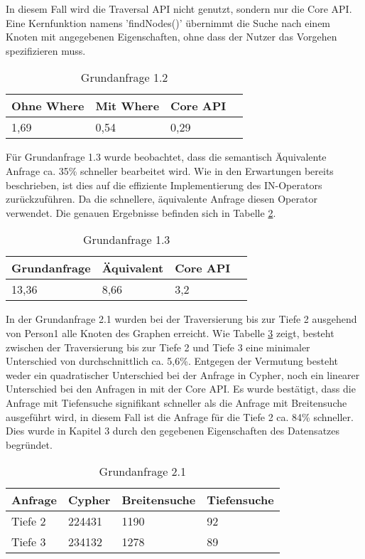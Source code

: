 In diesem Fall wird die Traversal API nicht genutzt, sondern nur die Core API. Eine Kernfunktion namens 'findNodes()' übernimmt die Suche nach einem Knoten mit angegebenen Eigenschaften, ohne dass der Nutzer das Vorgehen spezifizieren muss.  
\FloatBarrier
\begin{table}[h]
	\centering
		\begin{tabular}{ |p{3cm}|p{3cm}|p{3cm}|p{3cm}|  }
			\hline
			Ohne Where& Mit Where  &Core API\\
			\hline
			1,69   &  0,54  &0,29 \\
			\hline
		\end{tabular}
		\FloatBarrier
		\caption{Grundanfrage 1.2}
		\label{tab:Query1_2}
\end{table}
\FloatBarrier
Für Grundanfrage 1.3 wurde beobachtet, dass die semantisch Äquivalente Anfrage ca. 35\% schneller bearbeitet wird. Wie in den Erwartungen bereits beschrieben, ist dies auf die effiziente Implementierung des IN-Operators zurückzuführen. Da die schnellere, äquivalente Anfrage diesen Operator verwendet.
Die genauen Ergebnisse befinden sich in Tabelle	\ref{tab:Query1_3}.
\begin{table}[h]
	\centering
		\begin{tabular}{ |p{3cm}|p{3cm}|p{3cm}|p{3cm}|  }
			\hline
			Grundanfrage & Äquivalent&Core API\\
			\hline
			 13,36    & 8,66 &  3,2\\
			\hline
		\end{tabular}
		\caption{Grundanfrage 1.3}
		\label{tab:Query1_3}
\end{table}
\FloatBarrier
In der Grundanfrage 2.1 wurden bei der Traversierung bis zur Tiefe 2 ausgehend von Person1 alle Knoten des Graphen erreicht. Wie Tabelle \ref{tab:Query2_1} zeigt, besteht zwischen der Traversierung bis zur Tiefe 2 und Tiefe 3  eine minimaler Unterschied von durchschnittlich ca. 5,6\%. Entgegen der Vermutung besteht weder ein quadratischer Unterschied bei der Anfrage in Cypher, noch ein linearer Unterschied bei den Anfragen in mit der Core API. \newline 
Es wurde bestätigt, dass die Anfrage mit Tiefensuche signifikant schneller als die Anfrage mit Breitensuche ausgeführt wird, in diesem Fall ist die Anfrage für die Tiefe 2 ca. 84\% schneller. Dies wurde in Kapitel 3 durch den gegebenen Eigenschaften des Datensatzes begründet. 
\FloatBarrier
\begin{table}[h]
\centering
		\begin{tabular}{ |p{3cm}||p{3cm}|p{3cm}|p{3cm}|  }
			\hline
			Anfrage& Cypher & Breitensuche&Tiefensuche\\
			\hline
			Tiefe 2   & 224431    & 1190&  92\\
			Tiefe 3&    234132  & 1278   & 89\\
			\hline
		\end{tabular}
		\caption{Grundanfrage 2.1}
		\label{tab:Query2_1}
\end{table}
